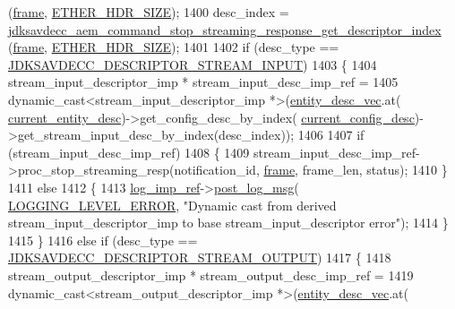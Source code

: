 \begin{DoxyCode}
{{{      (\hyperlink{gst__avb__playbin_8c_ac8e710e0b5e994c0545d75d69868c6f0}{frame}, \hyperlink{namespaceavdecc__lib_a6c827b1a0d973e18119c5e3da518e65ca9512ad9b34302ba7048d88197e0a2dc0}{ETHER\_HDR\_SIZE});
1400         desc\_index = 
      \hyperlink{group__command__stop__streaming__response_gae809969de67ed8d5343a27f6aeac63a8}{jdksavdecc\_aem\_command\_stop\_streaming\_response\_get\_descriptor\_index}
      (\hyperlink{gst__avb__playbin_8c_ac8e710e0b5e994c0545d75d69868c6f0}{frame}, \hyperlink{namespaceavdecc__lib_a6c827b1a0d973e18119c5e3da518e65ca9512ad9b34302ba7048d88197e0a2dc0}{ETHER\_HDR\_SIZE});
1401 
1402         \textcolor{keywordflow}{if} (desc\_type == \hyperlink{group__descriptor_ga4eb0b7597f11b5fc36f3625acd82e503}{JDKSAVDECC\_DESCRIPTOR\_STREAM\_INPUT})
1403         \{
1404             stream\_input\_descriptor\_imp * stream\_input\_desc\_imp\_ref =
1405                 \textcolor{keyword}{dynamic\_cast<}stream\_input\_descriptor\_imp *\textcolor{keyword}{>}(\hyperlink{classavdecc__lib_1_1end__station__imp_a72edab41bc56e3c1757944a7df188a3d}{entity\_desc\_vec}.at(
      \hyperlink{classavdecc__lib_1_1end__station__imp_afd78c89df26ba7641e1adb764c0e827d}{current\_entity\_desc})->get\_config\_desc\_by\_index(
      \hyperlink{classavdecc__lib_1_1end__station__imp_a60b1af40d35e8a86b0082c54ab6cb6a8}{current\_config\_desc})->get\_stream\_input\_desc\_by\_index(desc\_index));
1406 
1407             \textcolor{keywordflow}{if} (stream\_input\_desc\_imp\_ref)
1408             \{
1409                 stream\_input\_desc\_imp\_ref->proc\_stop\_streaming\_resp(notification\_id, 
      \hyperlink{gst__avb__playbin_8c_ac8e710e0b5e994c0545d75d69868c6f0}{frame}, frame\_len, status);
1410             \}
1411             \textcolor{keywordflow}{else}
1412             \{
1413                 \hyperlink{namespaceavdecc__lib_acbe3e2a96ae6524943ca532c87a28529}{log\_imp\_ref}->\hyperlink{classavdecc__lib_1_1log_a68139a6297697e4ccebf36ccfd02e44a}{post\_log\_msg}(
      \hyperlink{namespaceavdecc__lib_a501055c431e6872ef46f252ad13f85cdaf2c4481208273451a6f5c7bb9770ec8a}{LOGGING\_LEVEL\_ERROR}, \textcolor{stringliteral}{"Dynamic cast from derived stream\_input\_descriptor\_imp to base
       stream\_input\_descriptor error"});
1414             \}
1415         \}
1416         \textcolor{keywordflow}{else} \textcolor{keywordflow}{if} (desc\_type == \hyperlink{group__descriptor_gab458eb4963f42bfa5591d5dd604bedce}{JDKSAVDECC\_DESCRIPTOR\_STREAM\_OUTPUT})
1417         \{
1418             stream\_output\_descriptor\_imp * stream\_output\_desc\_imp\_ref =
1419                 \textcolor{keyword}{dynamic\_cast<}stream\_output\_descriptor\_imp *\textcolor{keyword}{>}(\hyperlink{classavdecc__lib_1_1end__station__imp_a72edab41bc56e3c1757944a7df188a3d}{entity\_desc\_vec}.at(
}}}
\end{DoxyCode}
